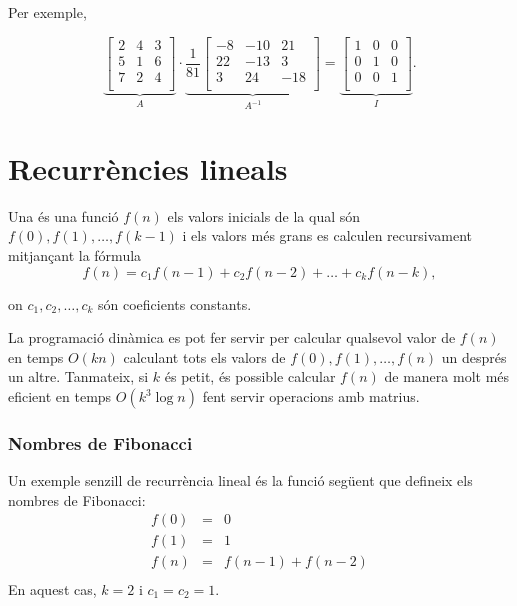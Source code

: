 Per exemple,


\[
\underbrace{
 \begin{bmatrix}
  2 & 4 & 3\\
  5 & 1 & 6\\
  7 & 2 & 4\\
 \end{bmatrix}
}_{A}
\cdot
\underbrace{
 \frac{1}{81}
 \begin{bmatrix}
   -8 & -10 & 21 \\
   22 & -13 & 3 \\
   3 & 24 & -18 \\
 \end{bmatrix}
}_{A^{-1}}
=
\underbrace{
 \begin{bmatrix}
  1 & 0 & 0 \\
  0 & 1 & 0 \\
  0 & 0 & 1 \\
 \end{bmatrix}
}_{I}.
\]


\section{Recurrències lineals}


Una  és una funció $f(n)$ els valors inicials
de la qual són $f(0),f(1),\ldots,f(k-1)$ i els valors més grans es
calculen recursivament mitjançant la fórmula
\[f(n) = c_1 f(n-1) + c_2 f(n-2) + \ldots + c_k f (n-k),\]

on $c_1,c_2,\ldots,c_k$ són coeficients constants.

La programació dinàmica es pot fer servir per calcular qualsevol valor
de $f(n)$ en temps $O(kn)$ calculant tots els valors de
$f(0),f(1),\ldots,f(n)$ un després un altre. Tanmateix, si $k$ és
petit, és possible calcular $f(n)$ de manera molt més eficient en
temps $O(k^3 \log n)$ fent servir operacions amb matrius.

\subsubsection{Nombres de Fibonacci}


Un exemple senzill de recurrència lineal és la funció següent que
defineix els nombres de Fibonacci:
\[
\begin{array}{lcl}
f(0) & = & 0 \\
f(1) & = & 1 \\
f(n) & = & f(n-1)+f(n-2) \\
\end{array}
\]
En aquest cas, $k=2$ i $c_1=c_2=1$.

